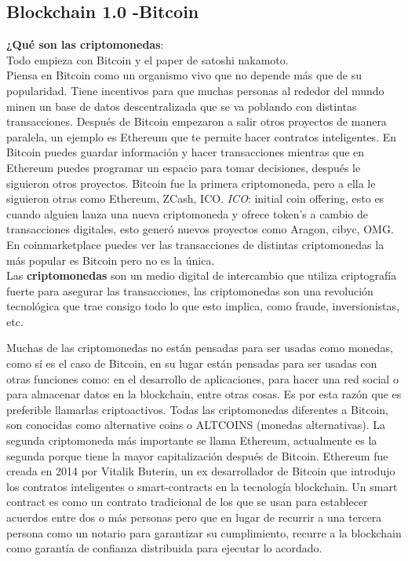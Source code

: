 \documentclass[a4paper,12pt]{lib/pub}
\begin{document}
\subsection{Blockchain 1.0 -Bitcoin}
\textbf{¿Qué son las criptomonedas}:\\
Todo empieza con Bitcoin y el paper de satoshi nakamoto.\\
Piensa en Bitcoin como un organismo vivo que no depende más que de su popularidad. Tiene incentivos para que muchas personas al rededor del mundo minen un base de datos descentralizada que se va poblando con distintas transacciones.
Después de Bitcoin empezaron a salir otros proyectos de manera paralela, un ejemplo es Ethereum que te permite hacer contratos inteligentes.
En Bitcoin puedes guardar información y hacer transacciones mientras que en Ethereum puedes programar un espacio para tomar decisiones, después le siguieron otros proyectos.
Bitcoin fue la primera criptomoneda, pero a ella le siguieron otras como Ethereum, ZCash, ICO.
\textit{ICO}: initial coin offering, esto es cuando alguien lanza una nueva criptomoneda y ofrece token's a cambio de transacciones digitales, esto generó nuevos proyectos como Aragon, cibyc, OMG.
En coinmarketplace puedes ver las transacciones de distintas criptomonedas la más popular es Bitcoin pero no es la única.\\

Las \textbf{criptomonedas} son un medio digital de intercambio que utiliza criptografía fuerte para asegurar las transacciones, 
las criptomonedas son una revolución tecnológica que trae consigo todo lo que esto implica, como fraude, inversionistas, etc.

Muchas de las criptomonedas no están pensadas para ser usadas como monedas, como sí es el caso de Bitcoin, en su lugar están pensadas para ser usadas con otras funciones como: en el desarrollo de aplicaciones, para hacer una red social o para almacenar datos en la blockchain, entre otras cosas. Es por esta razón que es preferible llamarlas criptoactivos.
Todas las criptomonedas diferentes a Bitcoin, son conocidas como alternative coins o ALTCOINS (monedas alternativas).
La segunda criptomoneda más importante se llama Ethereum, actualmente es la segunda porque tiene la mayor capitalización después de Bitcoin.
Ethereum fue creada en 2014 por Vitalik Buterin, un ex desarrollador de Bitcoin que introdujo los contratos inteligentes o smart-contracts en la tecnología blockchain.
Un smart contract es como un contrato tradicional de los que se usan para establecer acuerdos entre dos o más personas pero que en lugar de recurrir a una tercera persona como un notario para garantizar su cumplimiento, recurre a la blockchain como garantía de confianza distribuida para ejecutar lo acordado.
\end{document}
